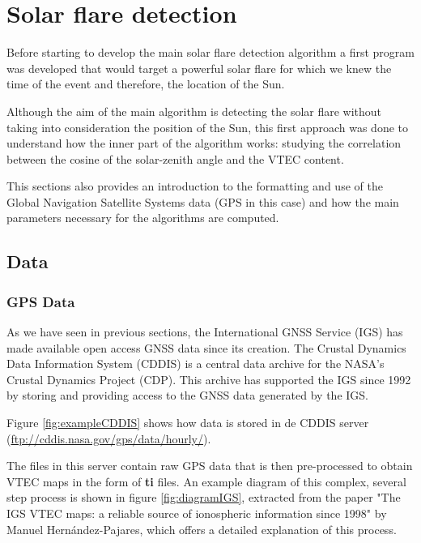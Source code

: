 \chapter{Solar flare detection}

Before starting to develop the main solar flare detection algorithm a first program was developed that would target a powerful solar flare for which we knew the time of the event and therefore, the location of the Sun.

Although the aim of the main algorithm is detecting the solar flare without taking into consideration the position of the Sun, this first approach was done to understand how the inner part of the algorithm works: studying the correlation between the cosine of the solar-zenith angle and the VTEC content.

This sections also provides an introduction to the formatting and use of the Global Navigation Satellite Systems data (GPS in this case) and how the main parameters necessary for the algorithms are computed.

\section{Data}

\subsection{GPS Data}

As we have seen in previous sections, the International GNSS Service (IGS) has made available open access GNSS data since its creation. The Crustal Dynamics Data Information System (CDDIS) is a central data archive for the NASA's Crustal Dynamics Project (CDP). This archive has supported the IGS since 1992 by storing and providing access to the GNSS data generated by the IGS.

Figure \ref{fig:exampleCDDIS} shows how data is stored in de CDDIS server (\url{ftp://cddis.nasa.gov/gps/data/hourly/}).

The files in this server contain raw GPS data that is then pre-processed to obtain VTEC maps in the form of \textbf{ti} files. An example diagram of this complex, several step process is shown in figure \ref{fig:diagramIGS}, extracted from the paper "The IGS VTEC maps: a reliable source of ionospheric information since 1998" \cite{hernandez2009igs} by Manuel Hernández-Pajares, which offers a detailed explanation of this process. 

